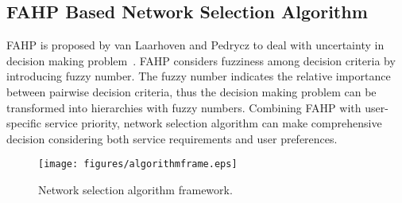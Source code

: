 \documentclass[conference]{IEEEtran}
\begin{document}



	




\subsection{FAHP Based Network Selection Algorithm}

FAHP is proposed by van Laarhoven and Pedrycz to deal with uncertainty in decision making problem~\cite{FAHP}. FAHP considers fuzziness among decision criteria by introducing fuzzy number. The fuzzy number indicates the relative importance between pairwise decision criteria, thus the decision making problem can be transformed into hierarchies with fuzzy numbers. 
Combining FAHP with user-specific service priority, network selection algorithm can make comprehensive decision considering both service requirements and user preferences.

\begin{figure}[htbp!]
	\centering
	\texttt{[image: figures/algorithmframe.eps]}
	\caption{Network selection algorithm framework.}\label{fig:algorithmframe}
	\vspace{-1em}
\end{figure}
\end{document}
